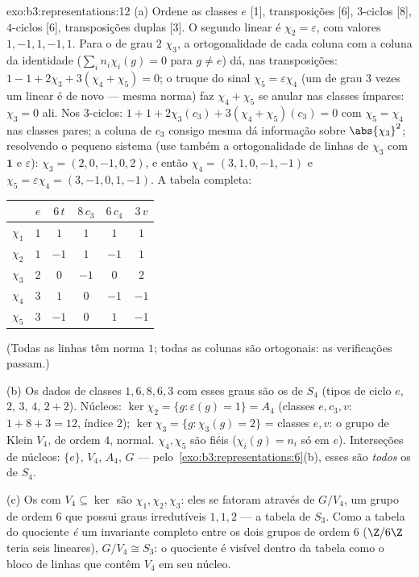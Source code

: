 \begin{solution}{exo:b3:representations:12}
(a) Ordene as classes $e$ [1], transposições [6],
$3$-ciclos [8], $4$-ciclos [6], transposições duplas [3].
O segundo  linear é $\chi_2 = \varepsilon$, com
valores $1, -1, 1, -1, 1$. Para o  de grau $2$
$\chi_3$, a ortogonalidade de cada coluna com a
coluna da identidade ($\sum_in_i\chi_i(g) = 0$ para $g \neq e$)
dá, nas transposições: $1 - 1 + 2\chi_3 + 3(\chi_4 +
\chi_5) = 0$; o truque do sinal $\chi_5 = \varepsilon\chi_4$
(um  de grau $3$ vezes um linear é de novo
 --- mesma norma) faz $\chi_4 + \chi_5$ se anular nas
classes ímpares: $\chi_3 = 0$ ali. Nos $3$-ciclos: $1 + 1 +
2\chi_3(c_3) + 3(\chi_4 + \chi_5)(c_3) = 0$ com
$\chi_5 = \chi_4$ nas classes pares; a coluna de $c_3$ consigo
mesma dá informação sobre $\abs{\chi_3}^2$; resolvendo o pequeno sistema
(use também a ortogonalidade de linhas de $\chi_3$ com $\mathbf 1$ e
$\varepsilon$): $\chi_3 = (2, 0, -1, 0, 2)$, e então $\chi_4 =
(3, 1, 0, -1, -1)$ e $\chi_5 = \varepsilon\chi_4 = (3, -1,
0, 1, -1)$. A tabela completa:
\begin{center}
\begin{tabular}{c|ccccc}
 & $e$ & $6\,t$ & $8\,c_3$ & $6\,c_4$ & $3\,v$\\
\hline
$\chi_1$ & $1$ & $1$ & $1$ & $1$ & $1$\\
$\chi_2$ & $1$ & $-1$ & $1$ & $-1$ & $1$\\
$\chi_3$ & $2$ & $0$ & $-1$ & $0$ & $2$\\
$\chi_4$ & $3$ & $1$ & $0$ & $-1$ & $-1$\\
$\chi_5$ & $3$ & $-1$ & $0$ & $1$ & $-1$\\
\end{tabular}
\end{center}
(Todas as linhas têm norma $1$; todas as colunas são ortogonais:
as verificações passam.)

(b) Os dados de classes $1, 6, 8, 6, 3$ com esses graus são os
de $S_4$ (tipos de ciclo $e$, $2$, $3$, $4$, $2{+}2$).
Núcleos: $\ker\chi_2 = \{g : \varepsilon(g) = 1\} = A_4$
(classes $e, c_3, v$: $1 + 8 + 3 = 12$, índice $2$);
$\ker\chi_3 = \{g : \chi_3(g) = 2\}$ = classes $e, v$: o
grupo de Klein $V_4$, de ordem $4$, normal. $\chi_4, \chi_5$
são fiéis ($\chi_i(g) = n_i$ só em $e$). Interseções
de núcleos: $\{e\}$, $V_4$, $A_4$, $G$ --- pelo~\cref{exo:b3:representations:6}(b), esses são \emph{todos} os
 de $S_4$.

(c) Os  com $V_4 \subseteq \ker$ são $\chi_1,
\chi_2, \chi_3$: eles se fatoram através de $G/V_4$, um grupo de
ordem $6$ que possui graus irredutíveis $1, 1, 2$ --- a
tabela de $S_3$. Como a tabela do quociente \emph{é} um
invariante completo entre os dois grupos de ordem $6$
($\Z/6\Z$ teria seis  lineares), $G/V_4 \cong
S_3$: o quociente é visível dentro da tabela como o bloco
de linhas que contêm $V_4$ em seu núcleo.
\end{solution}


